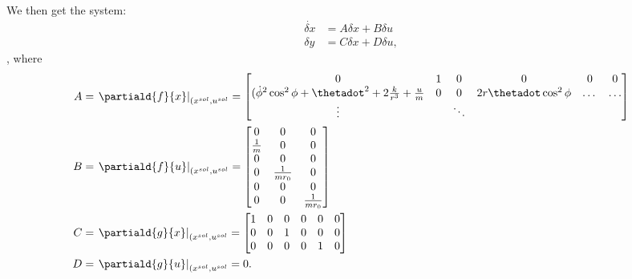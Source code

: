 \documentclass[10pt]{article}
\begin{document}
We then get the system:
\begin{equation}
  \begin{split}
    \dot{\delta x} &= A \delta x + B \delta u\\
    \delta y &= C\delta x + D \delta u,
  \end{split}
\end{equation},
where
\begin{align}
  A &= \left.\partiald{f}{x}\right|_{(\sol{x},\sol{u}} =
  \begin{bmatrix}
    0& 1& 0& 0& 0& 0\\
    (\dot{\phi}^2\cos^2\phi + \thetadot^2 + 2\frac{k}{r^3} +
    \frac{u}{m} & 0& 0& 2r\thetadot\cos^2\phi & \dots & \dots\\
    \vdots& &\ddots & & & 
  \end{bmatrix}
\\ 
  B &= \left.\partiald{f}{u}\right|_{(\sol{x},\sol{u}} = 
  \begin{bmatrix}
   0 &0&0 \\ 
   \frac{1}{m} &0 &0 \\
   0 &0 &0 \\
   0 &\frac{1}{mr_0} &0 \\
   0 &0 &0 \\
   0 &0 & \frac{1}{mr_0}
  \end{bmatrix} \\
  C &= \left.\partiald{g}{x}\right|_{(\sol{x},\sol{u}} = 
  \begin{bmatrix}
   1 &0 &0 &0 &0 &0 \\
   0 &0 &1 &0 &0 &0 \\
   0 &0 &0 &0 &1 &0 \\
  \end{bmatrix}\\
  D &= \left.\partiald{g}{u}\right|_{(\sol{x},\sol{u}} = 0.
\end{align}
\end{document}
